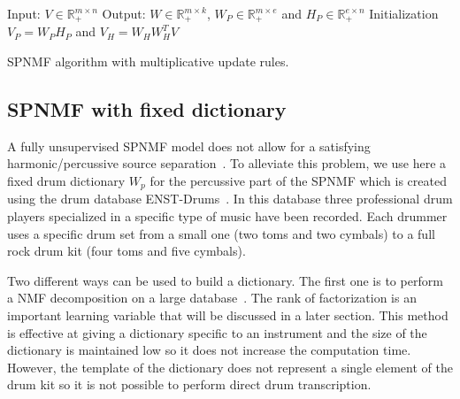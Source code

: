 \begin{algorithm}[h]
 Input: $V \in \mathbb{R}_{+}^{m \times n} $
 Output: $W \in \mathbb{R}_{+}^{m \times k}$, $W_P \in \mathbb{R}_+^{m \times e}$ and $H_P \in \mathbb{R}_{+}^{e \times n}$
 Initialization\;
 $ V_P = W_PH_P $ and
 $ V_H = W_HW_H^TV $ 
  
 \vspace{0.2cm}
 \caption{SPNMF algorithm with multiplicative update rules.}\label{AlgoMultipl}
\end{algorithm}


\subsection{SPNMF with fixed dictionary}\label{fixedict}  

A fully unsupervised SPNMF model does not allow for a satisfying harmonic/percussive source separation~\cite{laroche2015structured}. To alleviate this problem, we use here a fixed drum dictionary $W_p$ for the percussive part of the SPNMF which is created using the drum database ENST-Drums~\cite{gillet2006enst}. In this database three professional drum players specialized in a specific type of music have been recorded. Each drummer uses a specific drum set from a small one (two toms and two cymbals) to a full rock drum kit (four toms and five cymbals). 

Two different ways can be used to build a dictionary. The first one is to perform a NMF decomposition on a large database~\cite{jaureguiberry2011adaptation}. The rank of factorization is an important learning variable that will be discussed in a later section. This method is effective at giving a dictionary specific to an instrument and the size of the dictionary is maintained low so it does not increase the computation time. However, the template of the dictionary does not represent a single element of the drum kit so it is not possible to perform direct drum transcription.

